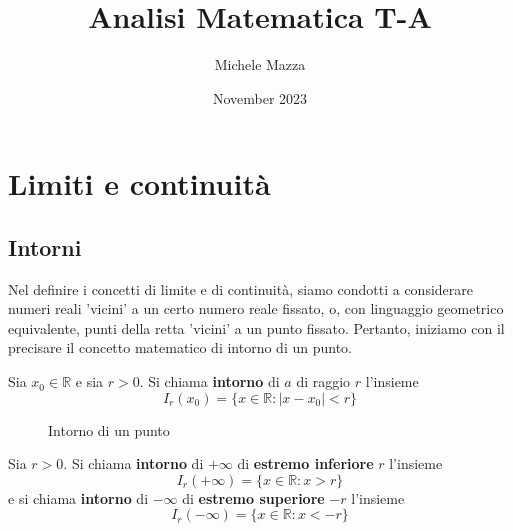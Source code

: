 \documentclass{book}
\title{Analisi Matematica T-A}
\author{Michele Mazza}
\date{November 2023}
\begin{document}
\frontmatter
\maketitle
\tableofcontents
\mainmatter

\chapter{Limiti e continuità}

\section{Intorni}
Nel definire i concetti di limite e di continuità, siamo condotti a considerare
numeri reali 'vicini' a un certo numero reale fissato, o, con linguaggio geometrico
equivalente, punti della retta 'vicini' a un punto fissato. Pertanto, iniziamo con
il precisare il concetto matematico di intorno di un punto.
\begin{definition}
    Sia $x_0 \in \mathbb{R}$ e sia $r > 0$. Si chiama \textbf{intorno} di $a$ di raggio $r$ l'insieme
    \begin{equation*}
        I_{r}(x_0) = \{x \in \mathbb{R} : |x - x_0| < r\}
    \end{equation*}
\end{definition}
\begin{figure}[H]
    \centering
    \caption{Intorno di un punto}
    \label{fig:intorno}
\end{figure}
\begin{definition}
    Sia $r > 0$. Si chiama \textbf{intorno} di $+\infty$ di \textbf{estremo inferiore} $r$ l'insieme
    \begin{equation*}
        I_{r}(+\infty) = \{x \in \mathbb{R} : x > r\}
    \end{equation*}
    e si chiama \textbf{intorno} di $-\infty$ di \textbf{estremo superiore} $-r$ l'insieme
    \begin{equation*}
        I_{r}(-\infty) = \{x \in \mathbb{R} : x < -r\}
    \end{equation*}
\end{definition}
\end{document}
